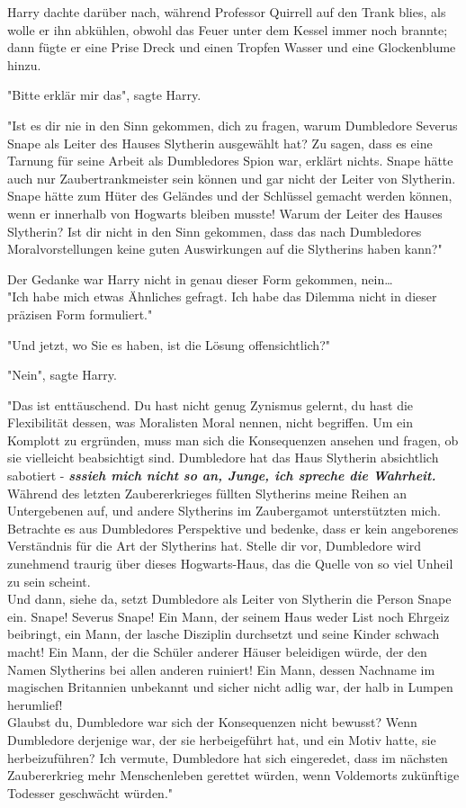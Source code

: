 {Harry dachte darüber nach, während Professor Quirrell auf den Trank blies, als wolle er ihn abkühlen, obwohl das Feuer unter dem Kessel immer noch brannte; dann fügte er eine Prise Dreck und einen Tropfen Wasser und eine Glockenblume hinzu.

"Bitte erklär mir das", sagte Harry.

"Ist es dir nie in den Sinn gekommen, dich zu fragen, warum Dumbledore Severus Snape als Leiter des Hauses Slytherin ausgewählt hat? Zu sagen, dass es eine Tarnung für seine Arbeit als Dumbledores Spion war, erklärt nichts. Snape hätte auch nur Zaubertrankmeister sein können und gar nicht der Leiter von Slytherin. Snape hätte zum Hüter des Geländes und der Schlüssel gemacht werden können, wenn er innerhalb von Hogwarts bleiben musste! Warum der Leiter des Hauses Slytherin? Ist dir nicht in den Sinn gekommen, dass das nach Dumbledores Moralvorstellungen keine guten Auswirkungen auf die Slytherins haben kann?"

Der Gedanke war Harry nicht in genau dieser Form gekommen, nein…\\ "Ich habe mich etwas Ähnliches gefragt. Ich habe das Dilemma nicht in dieser präzisen Form formuliert."

"Und jetzt, wo Sie es haben, ist die Lösung offensichtlich?"

"Nein", sagte Harry.

"Das ist enttäuschend. Du hast nicht genug Zynismus gelernt, du hast die Flexibilität dessen, was Moralisten Moral nennen, nicht begriffen. Um ein Komplott zu ergründen, muss man sich die Konsequenzen ansehen und fragen, ob sie vielleicht beabsichtigt sind. Dumbledore hat das Haus Slytherin absichtlich sabotiert - \textbf{\emph{sssieh mich nicht so an, Junge, ich spreche die Wahrheit.}} Während des letzten Zaubererkrieges füllten Slytherins meine Reihen an Untergebenen auf, und andere Slytherins im Zaubergamot unterstützten mich. Betrachte es aus Dumbledores Perspektive und bedenke, dass er kein angeborenes Verständnis für die Art der Slytherins hat. Stelle dir vor, Dumbledore wird zunehmend traurig über dieses Hogwarts-Haus, das die Quelle von so viel Unheil zu sein scheint.\\ Und dann, siehe da, setzt Dumbledore als Leiter von Slytherin die Person Snape ein. Snape! Severus Snape! Ein Mann, der seinem Haus weder List noch Ehrgeiz beibringt, ein Mann, der lasche Disziplin durchsetzt und seine Kinder schwach macht! Ein Mann, der die Schüler anderer Häuser beleidigen würde, der den Namen Slytherins bei allen anderen ruiniert! Ein Mann, dessen Nachname im magischen Britannien unbekannt und sicher nicht adlig war, der halb in Lumpen herumlief!\\ Glaubst du, Dumbledore war sich der Konsequenzen nicht bewusst? Wenn Dumbledore derjenige war, der sie herbeigeführt hat, und ein Motiv hatte, sie herbeizuführen? Ich vermute, Dumbledore hat sich eingeredet, dass im nächsten Zaubererkrieg mehr Menschenleben gerettet würden, wenn Voldemorts zukünftige Todesser geschwächt würden."

}
